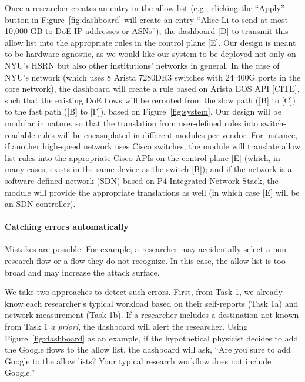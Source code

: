 Once a researcher creates an entry in the allow list (e.g., clicking the ``Apply'' button in Figure~\ref{fig:dashboard} will create an entry ``Alice Li to send at most 10,000 GB to DoE IP addresses or ASNs''), the dashboard [D] to transmit this allow list into the appropriate rules in the control plane [E]. Our design is meant to be hardware agnostic, as we would like our system to be deployed not only on NYU's HSRN but also other institutions' networks in general. In the case of NYU's network (which uses 8 Arista 7280DR3 switches with 24 400G ports in the core network), the dashboard will create a rule based on Arista EOS API [CITE], such that the existing DoE flows will be rerouted from the slow path ([B] to [C]) to the fast path ([B] to [F]), based on Figure~\ref{fig:system}. Our design will be modular in nature, so that the translation from user-defined rules into switch-readable rules will be encasuplated in different modules per vendor. For instance, if another high-speed network uses Cisco switches, the module will translate allow list rules into the appropriate Cisco APIs on the control plane [E] (which, in many cases, exists in the same device as the switch [B]); and if the network is a software defined network (SDN) based on P4 Integrated Network Stack, the module will provide the appropriate translations as well (in which case [E] will be an SDN controller).




\paragraph{Catching errors automatically}
Mistakes are possible. For example, a researcher may accidentally select a non-research flow or a flow they do not recognize. In this case, the allow list is too broad and may increase the attack surface.

We take two approaches to detect such errors. First, from Task 1, we already know each researcher's typical workload based on their self-reports (Task 1a) and network measurement (Task 1b). If a researcher includes a destination not known from Task 1 \textit{a priori}, the dashboard will alert the researcher. Using Figure~\ref{fig:dashboard} as an example, if the hypothetical physicist decides to add the Google flows to the allow list, the dashboard will ask, ``Are you sure to add Google to the allow lists? Your typical research workflow does not include Google.''

